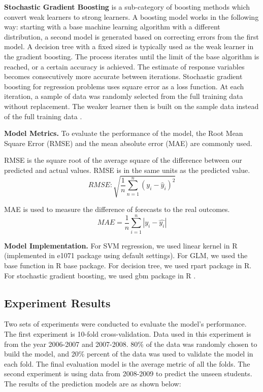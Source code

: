 \documentclass[12pt,english]{report}
\begin{document}
\vspace{0.15in}
\noindent \textbf{Stochastic Gradient Boosting} is a sub-category of boosting methods which convert weak learners to strong learners. A boosting model works in the following way: starting with a base machine learning algorithm with a different distribution,  a second model is generated based on correcting errors from the first model. A decision tree with a fixed sized is typically used as the weak learner in the gradient boosting. The process iterates until the limit of the base algorithm is reached, or a certain accuracy is achieved. The estimate of response variables becomes consecutively more accurate between iterations. Stochastic gradient boosting for regression problems uses square error as a loss function. At each iteration, a sample of data was randomly selected from the full training data without replacement. The weaker learner then is built on the sample data instead of the full training data \citep{FRIEDMAN2002367}. 
% 
% 

\vspace{0.15in}
\noindent \textbf{Model Metrics.} To evaluate the performance of the model, the Root Mean Square Error (RMSE)  and the mean absolute error (MAE) are commonly used. 

RMSE is the square root of the average square of the difference between our predicted and actual values. RMSE is in the same units as the predicted value.
\begin{equation}
RMSE:  \sqrt{\frac{1}{n}\sum_{n=1}^n (y_i-\hat{y}_i)^2}
\end{equation}

MAE is used to measure the difference of forecasts to the real outcomes.
\begin{equation}
MAE = \frac{1}{n}\sum_{i=1}^n \left| y_i - \hat{y_i}\right| 
\end{equation}

\vspace{0.15in}
\textbf{Model Implementation.} For SVM regression, we used linear kernel in R (implemented in e1071 package \citep{e1071} using default settings). For GLM, we used the base function in R base package. For decision tree, we used rpart package \citep{rpart} in R. For stochastic gradient boosting, we used  gbm package in R \citep{gbm}.

\subsection{Experiment Results}
Two sets of experiments were conducted to evaluate the model's performance. The first experiment is 10-fold cross-validation. Data used in this experiment is from the year 2006-2007 and 2007-2008.  80\% of the data was randomly chosen to build the model, and 20\% percent of the data was used to validate the model in each fold. The final evaluation model is the average metric of all the folds. The second experiment is using data from 2008-2009 to predict the unseen students.  The results of the prediction models are as shown below:
\end{document}
